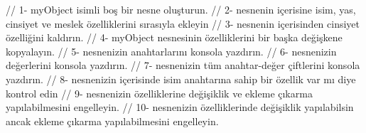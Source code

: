 // 1- myObject isimli boş bir nesne oluşturun.
// 2- nesnenin içerisine isim, yas, cinsiyet ve meslek özelliklerini sırasıyla ekleyin
// 3- nesnenin içerisinden cinsiyet özelliğini kaldırın.
// 4- myObject nesnesinin özelliklerini bir başka değişkene kopyalayın.
// 5- nesnenizin anahtarlarını konsola yazdırın.
// 6- nesnenizin değerlerini konsola yazdırın.
// 7- nesnenizin tüm anahtar-değer çiftlerini konsola yazdırın.
// 8- nesnenizin içerisinde isim anahtarına sahip bir özellik var mı diye kontrol edin
// 9- nesnenizin özelliklerine değişiklik ve ekleme çıkarma yapılabilmesini engelleyin.
// 10- nesnenizin özelliklerinde değişiklik yapılabilsin ancak ekleme çıkarma yapılabilmesini engelleyin.

